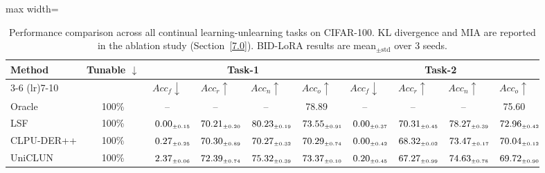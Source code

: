 \begin{table}[!htbp]
\centering
\footnotesize
\renewcommand{\arraystretch}{0.70}
\caption{Performance comparison across all continual learning-unlearning tasks on CIFAR-100. KL divergence and MIA are reported in the ablation study (Section~\ref{7.0}). BID-LoRA results are mean$_{\pm\text{std}}$ over 3 seeds.}
\label{tab:classification}
\begin{adjustbox}{max width=\textwidth}
\setlength{\tabcolsep}{5pt}
\begin{tabular}{l|c|cccc|cccc}
\toprule
\multirow{2}{*}{\textbf{Method}} & \multirow{2}{*}{\textbf{Tunable} $\downarrow$}
& \multicolumn{4}{c|}{\textbf{Task-1}} & \multicolumn{4}{c}{\textbf{Task-2}} \\
\cmidrule(lr){3-6} \cmidrule(lr){7-10}
& & $Acc_f \downarrow$ & $Acc_r \uparrow$ & $Acc_n \uparrow$ & $Acc_o \uparrow$
& $Acc_f \downarrow$ & $Acc_r \uparrow$ & $Acc_n \uparrow$ & $Acc_o \uparrow$ \\
\midrule
Oracle        & 100\% & -- & -- & -- & 78.89 & -- & -- & -- & 75.60 \\
\midrule
LSF & 100\% & $\kern6pt0.00_{\scriptscriptstyle \pm 0.15}\kern-6pt$ & $\kern6pt70.21_{\scriptscriptstyle \pm 0.20}\kern-6pt$ & \colorbox{green!25}{$\kern6pt80.23_{\scriptscriptstyle \pm 0.19}\kern-6pt$} & $\kern6pt73.55_{\scriptscriptstyle \pm 0.91}\kern-6pt$ & $\kern6pt0.00_{\scriptscriptstyle \pm 0.37}\kern-6pt$ & \colorbox{yellow!35}{$\kern6pt70.31_{\scriptscriptstyle \pm 0.45}\kern-6pt$} & \colorbox{green!25}{$\kern6pt78.27_{\scriptscriptstyle \pm 0.39}\kern-6pt$} & \colorbox{green!25}{$\kern6pt72.96_{\scriptscriptstyle \pm 0.42}\kern-6pt$} \\
CLPU-DER++ & 100\% & $\kern6pt0.27_{\scriptscriptstyle \pm 0.25}\kern-6pt$ & $\kern6pt70.30_{\scriptscriptstyle \pm 0.89}\kern-6pt$ & $\kern6pt70.27_{\scriptscriptstyle \pm 0.32}\kern-6pt$ & $\kern6pt70.29_{\scriptscriptstyle \pm 0.74}\kern-6pt$ & $\kern6pt0.00_{\scriptscriptstyle \pm 0.42}\kern-6pt$ & $\kern6pt68.32_{\scriptscriptstyle \pm 0.02}\kern-6pt$ & $\kern6pt73.47_{\scriptscriptstyle \pm 0.17}\kern-6pt$ & $\kern6pt70.04_{\scriptscriptstyle \pm 0.12}\kern-6pt$ \\
UniCLUN & 100\% & $\kern6pt2.37_{\scriptscriptstyle \pm 0.06}\kern-6pt$ & $\kern6pt72.39_{\scriptscriptstyle \pm 0.74}\kern-6pt$ & \colorbox{yellow!35}{$\kern6pt75.32_{\scriptscriptstyle \pm 0.39}\kern-6pt$} & $\kern6pt73.37_{\scriptscriptstyle \pm 0.10}\kern-6pt$ & $\kern6pt0.20_{\scriptscriptstyle \pm 0.45}\kern-6pt$ & $\kern6pt67.27_{\scriptscriptstyle \pm 0.99}\kern-6pt$ & $\kern6pt74.63_{\scriptscriptstyle \pm 0.78}\kern-6pt$ & $\kern6pt69.72_{\scriptscriptstyle \pm 0.90}\kern-6pt$ \\

\end{tabular}
\end{adjustbox}
\end{table}
